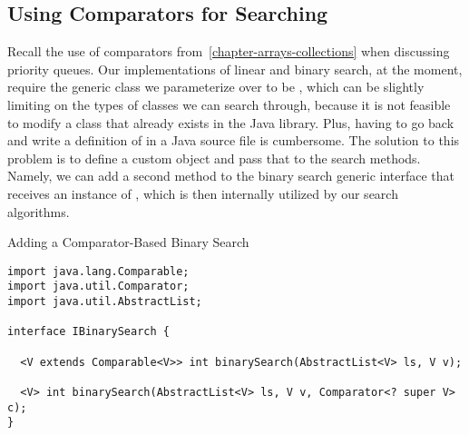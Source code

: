 \subsection{Using Comparators for Searching}
Recall the use of comparators from~\ref{chapter-arrays-collections} when discussing priority queues. Our implementations of linear and binary search, at the moment, require the generic class we parameterize over to be , which can be slightly limiting on the types of classes we can search through, because it is not feasible to modify a class that already exists in the Java library. Plus, having to go back and write a definition of  in a Java source file is cumbersome. The solution to this problem is to define a custom  object and pass that to the search methods. Namely, we can add a second method to the binary search generic interface that receives an instance of , which is then internally utilized by our search algorithms. 


\begin{cl}[]{Adding a Comparator-Based Binary Search}
\begin{lstlisting}[language=MyJava]
import java.lang.Comparable;
import java.util.Comparator;
import java.util.AbstractList;

interface IBinarySearch {

  <V extends Comparable<V>> int binarySearch(AbstractList<V> ls, V v);

  <V> int binarySearch(AbstractList<V> ls, V v, Comparator<? super V> c);
}
\end{lstlisting}
\end{cl}

